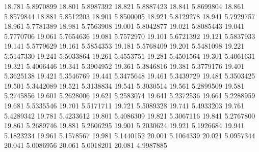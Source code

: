 18.781 5.8970899
18.801 5.8987392
18.821 5.8887423
18.841 5.8699804
18.861 5.8579844
18.881 5.8512203
18.901 5.8500005
18.921 5.8129278
18.941 5.7929757
18.961 5.7781389
18.981 5.7563908
19.001 5.8042877
19.021 5.8085443
19.041 5.7770706
19.061 5.7654636
19.081 5.7572970
19.101 5.6721392
19.121 5.5837933
19.141 5.5779629
19.161 5.5854353
19.181 5.5768409
19.201 5.5481098
19.221 5.5147330
19.241 5.5033864
19.261 5.4553751
19.281 5.4501564
19.301 5.4061631
19.321 5.4006446
19.341 5.3904952
19.361 5.3846816
19.381 5.3779176
19.401 5.3625138
19.421 5.3546769
19.441 5.3475648
19.461 5.3439729
19.481 5.3503425
19.501 5.3442089
19.521 5.3138834
19.541 5.3030514
19.561 5.2899509
19.581 5.2745856
19.601 5.2628006
19.621 5.2583074
19.641 5.2372536
19.661 5.2288959
19.681 5.5335546
19.701 5.5171711
19.721 5.5089328
19.741 5.4933203
19.761 5.4289342
19.781 5.4233612
19.801 5.4086309
19.821 5.3067116
19.841 5.2767800
19.861 5.2689746
19.881 5.2606295
19.901 5.2030624
19.921 5.1926684
19.941 5.1823234
19.961 5.1578567
19.981 5.1440152
20.001 5.1064339
20.021 5.0957344
20.041 5.0086956
20.061 5.0018201
20.081 4.9987885
